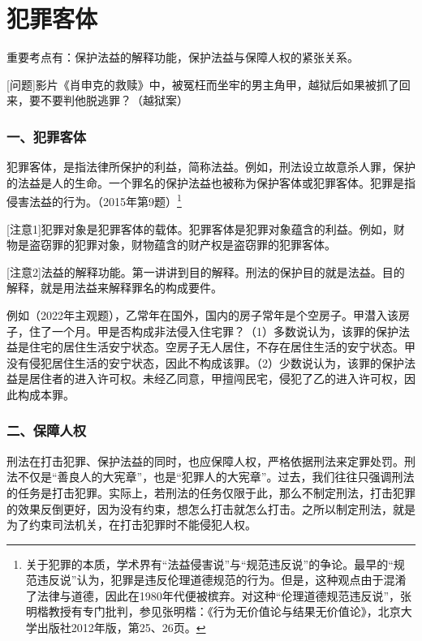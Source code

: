 \chapter{犯罪客体}

\begin{EditionOpeningPanel}
重要考点有：保护法益的解释功能，保护法益与保障人权的紧张关系。
\end{EditionOpeningPanel}

[问题]影片《肖申克的救赎》中，被冤枉而坐牢的男主角甲，越狱后如果被抓了回来，要不要判他脱逃罪？（越狱案）

\subsection*{一、犯罪客体}

犯罪客体，是指法律所保护的利益，简称法益。例如，刑法设立故意杀人罪，保护的法益是人的生命。一个罪名的保护法益也被称为保护客体或犯罪客体。犯罪是指侵害法益的行为。（2015年第9题）\footnote{关于犯罪的本质，学术界有“法益侵害说”与“规范违反说”的争论。最早的“规范违反说”认为，犯罪是违反伦理道德规范的行为。但是，这种观点由于混淆了法律与道德，因此在1980年代便被槟弃。对这种“伦理道德规范违反说”，张明楷教授有专门批判，参见张明楷：《行为无价值论与结果无价值论》，北京大学出版社2012年版，第25、26页。}

[注意1]犯罪对象是犯罪客体的载体。犯罪客体是犯罪对象蕴含的利益。例如，财物是盗窃罪的犯罪对象，财物蕴含的财产权是盗窃罪的犯罪客体。

[注意2]法益的解释功能。第一讲讲到目的解释。刑法的保护目的就是法益。目的解释，就是用法益来解释罪名的构成要件。

例如（2022年主观题），乙常年在国外，国内的房子常年是个空房子。甲潜入该房子，住了一个月。甲是否构成非法侵入住宅罪？（1）多数说认为，该罪的保护法益是住宅的居住生活安宁状态。空房子无人居住，不存在居住生活的安宁状态。甲没有侵犯居住生活的安宁状态，因此不构成该罪。（2）少数说认为，该罪的保护法益是居住者的进入许可权。未经乙同意，甲擅闯民宅，侵犯了乙的进入许可权，因此构成本罪。

\subsection*{二、保障人权}

刑法在打击犯罪、保护法益的同时，也应保障人权，严格依据刑法来定罪处罚。刑法不仅是“善良人的大宪章”，也是“犯罪人的大宪章”。过去，我们往往只强调刑法的任务是打击犯罪。实际上，若刑法的任务仅限于此，那么不制定刑法，打击犯罪的效果反倒更好，因为没有约束，想怎么打击就怎么打击。之所以制定刑法，就是为了约束司法机关，在打击犯罪时不能侵犯人权。

